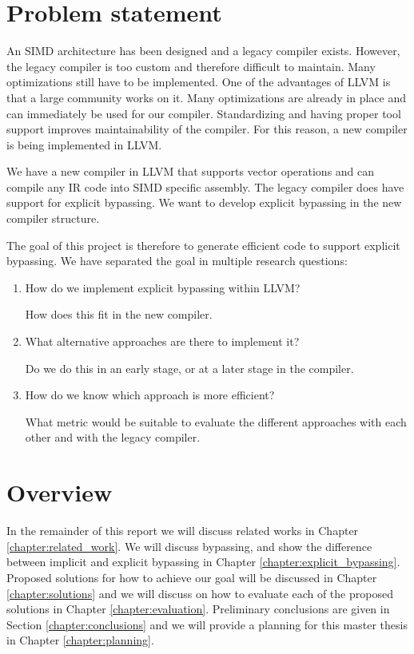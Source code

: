 \section{Problem statement}\label{sec:problem_statement}
An SIMD architecture has been designed and a legacy compiler exists. However, the legacy compiler is too custom and therefore difficult to maintain. Many optimizations still have to be implemented. One of the advantages of LLVM is that a large community works on it. Many optimizations are already in place and can immediately be used for our compiler. Standardizing and having proper tool support improves maintainability of the compiler. %
For this reason, a new compiler is being implemented in LLVM.

We have a new compiler in LLVM that supports vector operations and can compile any IR code into SIMD specific assembly. The legacy compiler does have support for explicit bypassing. We want to develop explicit bypassing in the new compiler structure.

The goal of this project is therefore to generate efficient code to support explicit bypassing. We have separated the goal in multiple research questions:

\begin{enumerate}
\item How do we implement explicit bypassing within LLVM?

How does this fit in the new compiler.
\item What alternative approaches are there to implement it?

Do we do this in an early stage, or at a later stage in the compiler.
\item How do we know which approach is more efficient?

What metric would be suitable to evaluate the different approaches with each other and with the legacy compiler.
\end{enumerate}





\section{Overview}\label{sec:overview}
In the remainder of this report we will discuss related works in Chapter \ref{chapter:related_work}. We will discuss bypassing, and show the difference between implicit and explicit bypassing in Chapter \ref{chapter:explicit_bypassing}. Proposed solutions for how to achieve our goal will be discussed in Chapter \ref{chapter:solutions} and we will discuss on how to evaluate each of the proposed solutions in Chapter \ref{chapter:evaluation}. Preliminary conclusions are given in Section \ref{chapter:conclusions} and we will provide a planning for this master thesis in Chapter \ref{chapter:planning}.